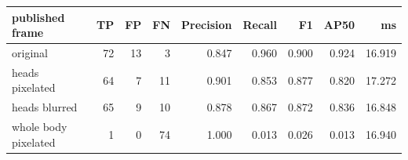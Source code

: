 \begin{tabular}{lrrrrrrrr}
\toprule
published frame & TP & FP & FN & Precision & Recall & F1 & AP50 & ms \\
\midrule
original & 72 & 13 & 3 & 0.847 & 0.960 & 0.900 & 0.924 & 16.919 \\
heads pixelated & 64 & 7 & 11 & 0.901 & 0.853 & 0.877 & 0.820 & 17.272 \\
heads blurred & 65 & 9 & 10 & 0.878 & 0.867 & 0.872 & 0.836 & 16.848 \\
whole body pixelated & 1 & 0 & 74 & 1.000 & 0.013 & 0.026 & 0.013 & 16.940 \\
\bottomrule
\end{tabular}
